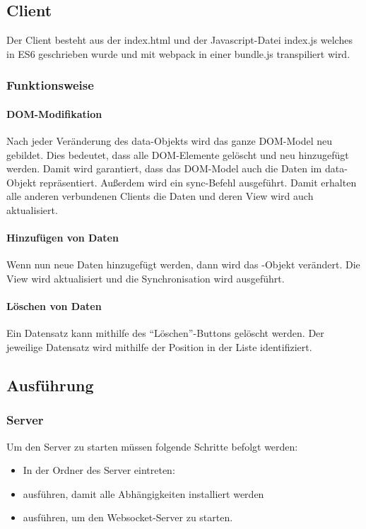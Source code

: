 \subsection{Client}
Der Client besteht aus der index.html und der Javascript-Datei index.js welches in ES6 geschrieben wurde und mit webpack in einer bundle.js transpiliert wird.

\subsubsection{Funktionsweise}

\paragraph{DOM-Modifikation}
Nach jeder Veränderung des data-Objekts wird das ganze DOM-Model neu gebildet. Dies bedeutet, dass alle DOM-Elemente gelöscht und neu hinzugefügt werden. Damit wird garantiert, dass das DOM-Model auch die Daten im data-Objekt repräsentiert. Außerdem wird ein sync-Befehl ausgeführt. Damit erhalten alle anderen verbundenen Clients die Daten und deren View wird auch aktualisiert.

\paragraph{Hinzufügen von Daten}
Wenn nun neue Daten hinzugefügt werden, dann wird das -Objekt verändert. Die View wird aktualisiert und die Synchronisation wird ausgeführt.

\paragraph{Löschen von Daten}
Ein Datensatz kann mithilfe des ``Löschen''-Buttons gelöscht werden. Der jeweilige Datensatz wird mithilfe der Position in der Liste identifiziert.

\subsection{Ausführung}

\subsubsection{Server}
Um den Server zu starten müssen folgende Schritte befolgt werden:
\begin{itemize}
	\item In der Ordner des Server eintreten: 
	\item {} ausführen, damit alle Abhängigkeiten installiert werden
	\item {} ausführen, um den Websocket-Server zu starten.
\end{itemize}

